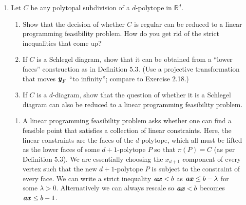 \documentclass{article}
\begin{document}
\begin{enumerate}
\begin{solution}
Alternatively, consider the 3 vertices in the bottom triangle face labeled $1,2,3$. WLOG (by an affine transformation, say) we can fix the coordinates of the top tetrahedron and also fix the direction and length of the 3 vertical edges connecting the top tetrahedron to the bottom triangle. Then the first $3$ coordinates of $[3]$ must be fixed, and write $f(i)$ as the 4th coordinate (i.e. component in $x_4$) of vertex $i$. But then (similar to Ziegler's 2D example, given earlier in the chapter) we get $f(1) > f(2) > f(3) > f(1)$, a contradiction. 
\end{solution}

\item Let $C$ be any polytopal subdivision of a $d$-polytope in $\mathbb{R}^d$.

\begin{enumerate}[label=(\roman*)]
\item Show that the decision of whether $C$ is regular can be reduced to a linear programming feasibility problem. How do you get rid of the strict inequalities that come up?

\item If $C$ is a Schlegel diagram, show that it can be obtained from a ``lower faces'' construction as in Definition 5.3. (Use a projective transformation that moves $\textbf{\textit{y}}_F$ ``to infinity''; compare to Exercise 2.18.)

\item If $C$ is a $d$-diagram, show that the question of whether it is a Schlegel diagram can also be reduced to a linear programming feasibility problem.
\end{enumerate}

\begin{solution}
\begin{enumerate}[label=(\roman*)]
    \item A linear programming feasibility problem asks whether one can find a feasible point that satisfies a collection of linear constraints. Here, the linear constraints are the faces of the $d$-polytope, which all must be lifted as the lower faces of some $d+1$-polytope $P$ so that $\pi(P) = C$ (as per Definition 5.3). We are essentially choosing the $x_{d+1}$ component of every vertex such that the new $d+1$-polytope $P$ is subject to the constraint of every face. We can write a strict inequality $\textbf{\textit{ax}} < b$ as $\textbf{\textit{ax}} \leq b - \lambda$ for some $\lambda > 0$. Alternatively we can always rescale so $\textbf{\textit{ax}} < b$ becomes $\textbf{\textit{ax}} \leq b-1$.


\end{enumerate}
\end{solution}
\end{enumerate}
\end{document}

